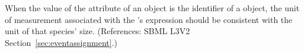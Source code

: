 When the value of the attribute  of an \EventAssignment
object is the identifier of a \Species object, the unit of measurement
associated with the \EventAssignment's  expression should be
consistent with the unit of that species' size.  (References: SBML L3V2
Section~\ref{sec:eventassignment}.)
